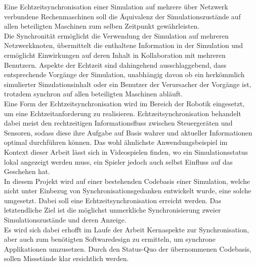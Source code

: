 Eine Echtzeitsynchronisation einer Simulation auf mehrere über Netzwerk verbundene Rechenmaschinen soll die Äquivalenz der Simulationszustände auf allen beteiligten Maschinen zum selben Zeitpunkt gewährleisten.\\
Die Synchronität ermöglicht die Verwendung der Simulation auf mehreren Netzwerkknoten, übermittelt die enthaltene Information in der Simulation und ermöglicht Einwirkungen auf deren Inhalt in Kollaboration mit mehreren Benutzern.
Aspekte der Echtzeit sind dahingehend ausschlaggebend, dass entsprechende Vorgänge der Simulation, unabhängig davon ob ein
herkömmlich simulierter Simulationsinhalt oder ein Benutzer der Verursacher der Vorgänge ist, trotzdem synchron auf allen beteiligten Maschinen abläuft.\\

Eine Form der Echtzeitsynchronisation wird im Bereich der Robotik eingesetzt, um eine Echtzeitanforderung zu realisieren. Echtzeitsynchronisation behandelt dabei meist den rechtzeitigen Informationsfluss zwischen Steuergeräten und Sensoren, sodass diese ihre Aufgabe auf Basis wahrer und aktueller Informationen optimal durchführen können.
Das wohl ähnlichste Anwendungsbeispiel im Kontext dieser Arbeit lässt sich in Videospielen finden, wo ein Simulationsstatus lokal angezeigt werden muss, ein Spieler jedoch auch selbst Einfluss auf das Geschehen hat.\\
In diesem Projekt wird auf einer bestehenden Codebasis einer Simulation, welche nicht unter Einbezug von Synchronisationsgedanken entwickelt wurde, eine solche umgesetzt. Dabei soll eine Echtzeitsynchronisation erreicht werden.
Das letztendliche Ziel ist die möglichst unmerkliche Synchronisierung zweier Simulationszustände und deren Anzeige.\\
Es wird sich dabei erhofft im Laufe der Arbeit Kernaspekte zur Synchronisation, aber auch zum benötigten Softwaredesign zu ermitteln, um synchrone Applikationen umzusetzen. Durch den Status-Quo der übernommenen Codebasis, sollen Missstände klar ersichtlich werden.